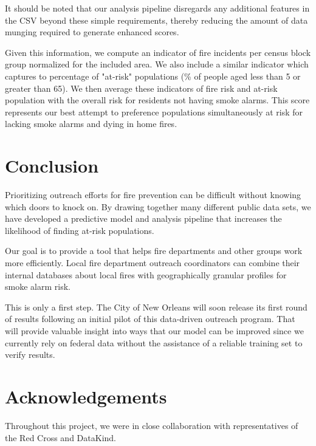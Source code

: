 \documentclass{sig-alternate}
\begin{document}
It should be noted that our analysis pipeline disregards any additional features in the CSV beyond these simple requirements, thereby reducing the amount of data munging required to generate enhanced scores.

Given this information, we compute an indicator of fire incidents per census block group normalized for the included area. We also include a similar indicator which captures to percentage of "at-risk" populations (\% of people aged less than 5 or greater than 65). We then average these indicators of fire risk and at-risk population with the overall risk for residents not having smoke alarms.  This score represents our best attempt to preference populations simultaneously at risk for lacking smoke alarms and dying in home fires.

\section{Conclusion}

Prioritizing outreach efforts for fire prevention can be difficult without knowing which doors to knock on. By drawing together many different public data sets, we have developed a predictive model and analysis pipeline that increases the likelihood of finding at-risk populations.

Our goal is to provide a tool that helps fire departments and other groups work more efficiently. Local fire department outreach coordinators can combine their internal databases about local fires with geographically granular profiles for smoke alarm risk. 

This is only a first step. The City of New Orleans will soon release its first round of results following an initial pilot of this data-driven outreach program. That will provide valuable insight into ways that our model can be improved since we currently rely on federal data without the assistance of a reliable training set to verify results. 

\section{Acknowledgements}
Throughout this project, we were in close collaboration with representatives of the Red Cross and DataKind.



\end{document}
